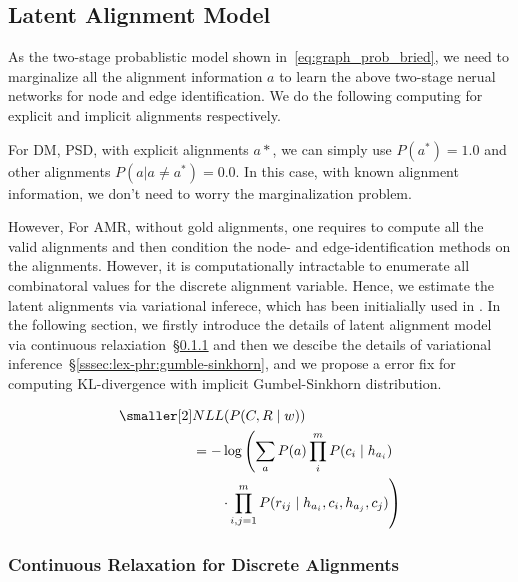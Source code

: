 \subsection{Latent Alignment Model}
\label{ssec:lex-phr:latent-alignment}

As the two-stage probablistic model shown
in~\autoref{eq:graph_prob_bried}, we need to marginalize all the
alignment information $a$ to learn the above two-stage nerual networks
for node and edge identification. We do the following computing for
explicit and implicit alignments respectively.

 For DM, PSD, with explicit alignments
$a*$, we can simply use $P(a^{*}) = 1.0$ and other alignments
$P(a | a \neq a^{*}) = 0.0 $. In this case, with known alignment
information, we don't need to worry the marginalization problem.

 However, For AMR, without gold
alignments, one requires to compute all the valid alignments and then
condition the node- and edge-identification methods on the alignments.
However, it is computationally intractable to enumerate all
combinatoral values for the discrete alignment variable. Hence, we
estimate the latent alignments via variational inferece, which has
been initialially used in \citet{lyu2018amr}. In the following
section, we firstly introduce the details of latent alignment model
via continuous relaxiation~\S\ref{sssec:lex-phr:alignment-relax} and
then we descibe the details of variational
inference~\S\ref{sssec:lex-phr:gumble-sinkhorn}, and we propose a
error fix for computing KL-divergence with implicit Gumbel-Sinkhorn
distribution.

\begin{equation}
  \label{eq:graph_prob_brief}
\begin{aligned} \smaller[2]
 & NLL(P(C,R \mid w)) \\
 & = - \log\left(\sum_{a}P(a) \prod_{i}^{m} P(c_{i} \mid h_{a_{i}}) \right. \\
 & \qquad \left.\cdot \prod_{i,j=1}^{m}P(r_{ij} \mid h_{a_{i}}, c_{i}, h_{a_{j}}, c_{j})\right)
\end{aligned}
\end{equation}

\subsubsection{Continuous Relaxation for Discrete Alignments}
\label{sssec:lex-phr:alignment-relax}

